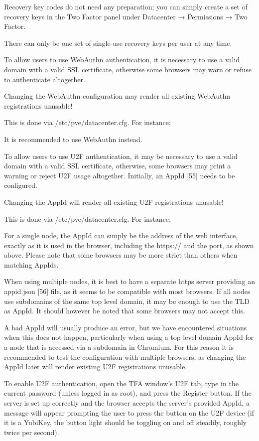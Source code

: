 Recovery key codes do not need any preparation; you can simply create a set of recovery keys in the Two Factor panel under Datacenter → Permissions → Two Factor.

There can only be one set of single-use recovery keys per user at any time.

To allow users to use WebAuthn authentication, it is necessary to use a valid domain with a valid SSL certificate, otherwise some browsers may warn or refuse to authenticate altogether.

Changing the WebAuthn configuration may render all existing WebAuthn registrations unusable!

This is done via /etc/pve/datacenter.cfg. For instance:

It is recommended to use WebAuthn instead.

To allow users to use U2F authentication, it may be necessary to use a valid domain with a valid SSL certificate, otherwise, some browsers may print a warning or reject U2F usage altogether. Initially, an AppId [55] needs to be configured.

Changing the AppId will render all existing U2F registrations unusable!

This is done via /etc/pve/datacenter.cfg. For instance:

For a single node, the AppId can simply be the address of the web interface, exactly as it is used in the browser, including the https:// and the port, as shown above. Please note that some browsers may be more strict than others when matching AppIds.

When using multiple nodes, it is best to have a separate https server providing an appid.json [56] file, as it seems to be compatible with most browsers. If all nodes use subdomains of the same top level domain, it may be enough to use the TLD as AppId. It should however be noted that some browsers may not accept this.

A bad AppId will usually produce an error, but we have encountered situations when this does not happen, particularly when using a top level domain AppId for a node that is accessed via a subdomain in Chromium. For this reason it is recommended to test the configuration with multiple browsers, as changing the AppId later will render existing U2F registrations unusable.

To enable U2F authentication, open the TFA window’s U2F tab, type in the current password (unless logged in as root), and press the Register button. If the server is set up correctly and the browser accepts the server’s provided AppId, a message will appear prompting the user to press the button on the U2F device (if it is a YubiKey, the button light should be toggling on and off steadily, roughly twice per second).

